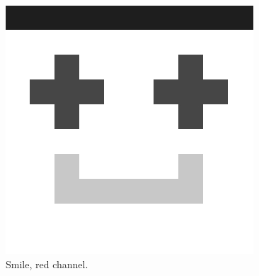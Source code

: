 \begin{figure}[ht]
\begin{minipage}[t]{0.45\linewidth}
        \includegraphics[width=\textwidth]{images/smile/smile-red-channel.jpg}
        \caption{Smile, red channel.}
        \label{fig:smile-red}
    \end{minipage}
\end{figure}
